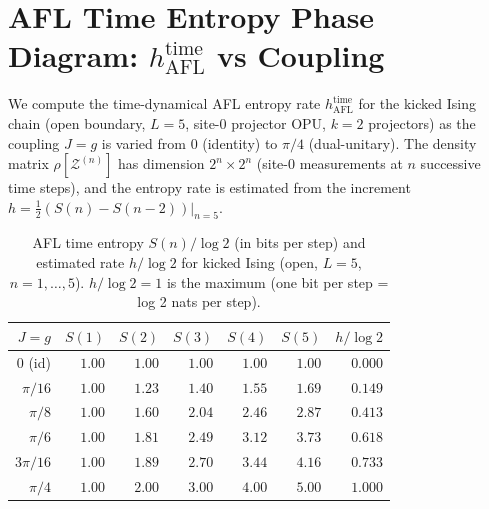 \documentclass[12pt,a4paper]{article}
\begin{document}
\section{AFL Time Entropy Phase Diagram: $h_{\mathrm{AFL}}^{\mathrm{time}}$ vs Coupling}
\label{sec:hafl_phase}

We compute the time-dynamical AFL entropy rate $h_{\mathrm{AFL}}^{\mathrm{time}}$ for
the kicked Ising chain (open boundary, $L=5$, site-0 projector OPU,
$k=2$ projectors) as the coupling $J=g$ is varied from $0$ (identity)
to $\pi/4$ (dual-unitary).  The density matrix $\rho[\mathcal{Z}^{(n)}]$
has dimension $2^n\times 2^n$ (site-0 measurements at $n$ successive time
steps), and the entropy rate is estimated from the increment
$h = \tfrac{1}{2}(S(n)-S(n-2))|_{n=5}$.

\begin{table}[h!]
\centering
\caption{AFL time entropy $S(n)/\log 2$ (in bits per step) and estimated
rate $h/\log 2$ for kicked Ising (open, $L=5$, $n=1,\ldots,5$).
$h/\log 2=1$ is the maximum (one bit per step = log 2 nats per step).}
\label{tab:hafl_phase}
\begin{tabular}{r|rrrrr|r}
\hline
$J=g$ & $S(1)$ & $S(2)$ & $S(3)$ & $S(4)$ & $S(5)$ & $h/\log 2$ \\
\hline
$0$ (id)  & $1.00$ & $1.00$ & $1.00$ & $1.00$ & $1.00$ & $0.000$ \\
$\pi/16$  & $1.00$ & $1.23$ & $1.40$ & $1.55$ & $1.69$ & $0.149$ \\
$\pi/8$   & $1.00$ & $1.60$ & $2.04$ & $2.46$ & $2.87$ & $0.413$ \\
$\pi/6$   & $1.00$ & $1.81$ & $2.49$ & $3.12$ & $3.73$ & $0.618$ \\
$3\pi/16$ & $1.00$ & $1.89$ & $2.70$ & $3.44$ & $4.16$ & $0.733$ \\
$\pi/4$   & $1.00$ & $2.00$ & $3.00$ & $4.00$ & $5.00$ & $1.000$ \\
\hline
\end{tabular}
\end{table}
\end{document}
